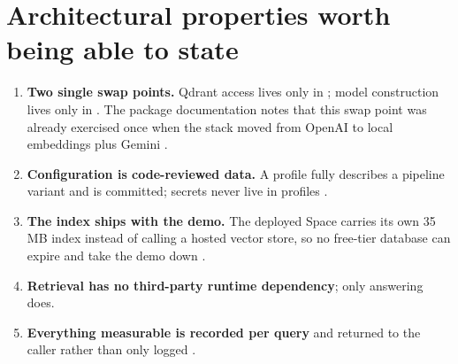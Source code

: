 \section{Architectural properties worth being able to state}

\begin{enumerate}
  \item \textbf{Two single swap points.} Qdrant access lives only in ; model construction lives only in . The package documentation notes that this swap point was already exercised once when the stack moved from OpenAI to local embeddings plus Gemini .
  \item \textbf{Configuration is code-reviewed data.} A profile fully describes a pipeline variant and is committed; secrets never live in profiles .
  \item \textbf{The index ships with the demo.} The deployed Space carries its own 35\,MB index instead of calling a hosted vector store, so no free-tier database can expire and take the demo down .
  \item \textbf{Retrieval has no third-party runtime dependency}; only answering does.
  \item \textbf{Everything measurable is recorded per query} and returned to the caller rather than only logged .
\end{enumerate}
